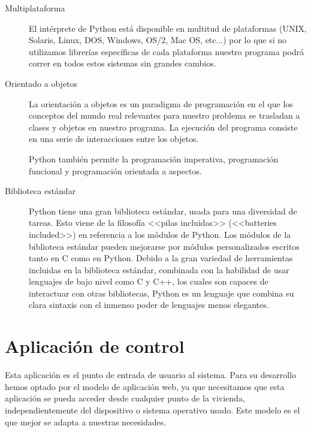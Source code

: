 \begin{description}
     \item[Multiplataforma] El intérprete de Python está disponible en multitud de plataformas (UNIX, Solaris, Linux, DOS, Windows, OS/2, Mac OS, etc...) por lo que si no utilizamos librerías específicas de cada plataforma nuestro programa podrá correr en todos estos sistemas sin grandes cambios.
     
     \item[Orientado a objetos] La orientación a objetos es un paradigma de programación en el que los conceptos del mundo real relevantes para nuestro problema se trasladan a clases y objetos en nuestro programa. La ejecución del programa consiste en una serie de interacciones entre los objetos.
     
     Python también permite la programación imperativa, programación funcional y programación orientada a aspectos.
     
     \item[Biblioteca estándar] Python tiene una gran biblioteca estándar, usada para una diversidad de tareas. Esto viene de la filosofía <<pilas incluidas>> (<<batteries included>>) en referencia a los módulos de Python. Los módulos de la biblioteca estándar pueden mejorarse por módulos personalizados escritos tanto en C como en Python. Debido a la gran variedad de herramientas incluidas en la biblioteca estándar, combinada con la habilidad de usar lenguajes de bajo nivel como C y C++, los cuales son capaces de interactuar con otras bibliotecas, Python es un lenguaje que combina su clara sintaxis con el inmenso poder de lenguajes menos elegantes.
    \end{description}
    
\section{Aplicación de control}
Esta aplicación es el punto de entrada de usuario al sistema. Para su desarrollo hemos optado por el modelo de aplicación web, ya que necesitamos que esta aplicación se pueda acceder desde cualquier punto de la vivienda, independientemente del dispositivo o sistema operativo usado. Este modelo es el que mejor se adapta a nuestras necesidades.

